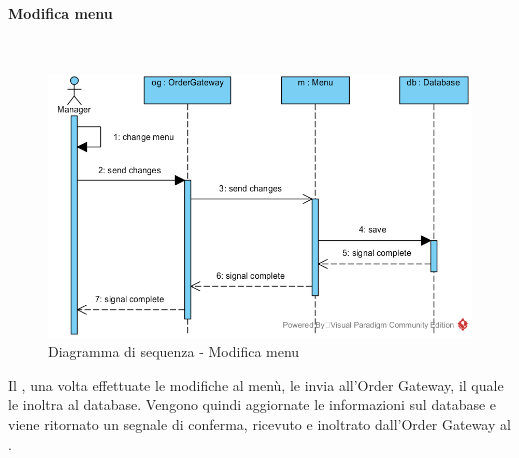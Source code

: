 \begin{samepage}
\paragraph{Modifica menu}\mbox{}\\
\end{samepage}
\begin{figure}[H]
	\centering
	\includegraphics[width=15cm]{../../documenti/SpecificaTecnica/diagrammi_img/sequenza/direttore_modifica_menu.png}
	\caption{Diagramma di sequenza - Modifica menu}
\end{figure}
Il \Manager{}, una volta effettuate le modifiche al menù, le invia all'Order Gateway, il quale le inoltra al database. Vengono quindi aggiornate le informazioni sul database e viene ritornato un segnale di conferma, ricevuto e inoltrato dall'Order Gateway al \Manager{}.


